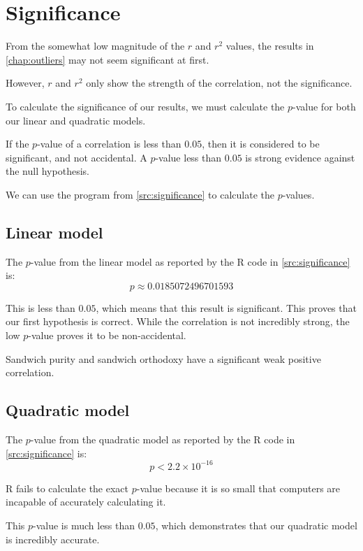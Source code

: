 \chapter{Significance}\label{chap:significance}

From the somewhat low magnitude of the $r$ and $r^2$ values, the results in \vref{chap:outliers} may not seem significant at first.

However, $r$ and $r^2$ only show the strength of the correlation, not the significance.

To calculate the significance of our results, we must calculate the $p$-value for both our linear and quadratic models.\cite{pVals}

If the $p$-value of a correlation is less than $0.05$, then it is considered to be significant, and not accidental.
A $p$-value less than $0.05$ is strong evidence against the null hypothesis.\cite{pVals}

We can use the program from \vref{src:significance} to calculate the $p$-values.

\section{Linear model}
The $p$-value from the linear model as reported by the R code in \vref{src:significance} is:
\[p \approx 0.0185072496701593\]

This is less than $0.05$, which means that this result is significant.
This proves that our first hypothesis is correct.
While the correlation is not incredibly strong, the low $p$-value proves it to be non-accidental.

Sandwich purity and sandwich orthodoxy have a significant weak positive correlation.

\section{Quadratic model}
The $p$-value from the quadratic model as reported by the R code in \vref{src:significance} is:
\[p < 2.2 \times 10 ^ {-16}\]

R fails to calculate the exact $p$-value because it is so small that computers are incapable of accurately calculating it.

This $p$-value is much less than $0.05$, which demonstrates that our quadratic model is incredibly accurate.
